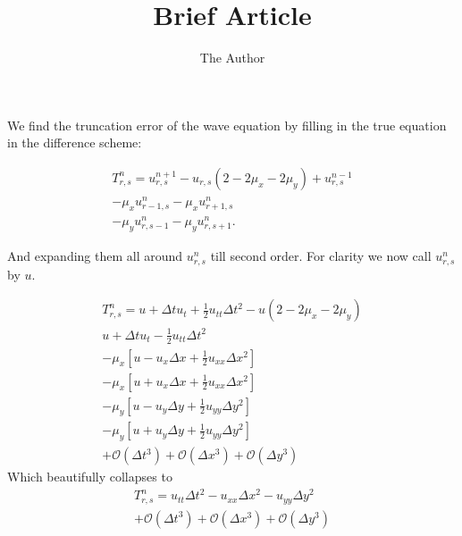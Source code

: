 \documentclass[11pt, oneside]{article}   	%
\title{Brief Article}
\author{The Author}
\begin{document}
\maketitle
We find the truncation error of the wave equation by filling in the true equation in the difference scheme:

\begin{align*}
T_{r,s}^n = u_{r,s}^{n+1} - u_{r,s}(2 - 2\mu_x - 2 \mu_y) + u_{r,s}^{n-1} \\
				 - \mu_x u_{r-1,s}^n - \mu_x u_{r+1,s}^n	  \\
				 - \mu_y u_{r,s-1}^n - \mu_y u_{r,s+1}^n.
\end{align*}

And expanding them all around $u_{r,s}^n$ till second order. For clarity we now call $u_{r,s}^n$ by $u$.

\begin{align*}
T_{r,s}^n = u +  \Delta t u_t + \frac{1}{2} u_{tt} \Delta t^2 - u(2 - 2\mu_x - 2 \mu_y) \\
				u +  \Delta t u_t - \frac{1}{2} u_{tt} \Delta t^2  \\
				 - \mu_x \left[{ u - u_x \Delta x + \frac{1}{2} u_{xx} \Delta x^2 }\right]	  \\
				 - \mu_x \left[{ u + u_x \Delta x + \frac{1}{2} u_{xx} \Delta x^2 }\right]	  \\
				 - \mu_y \left[{ u - u_y \Delta y + \frac{1}{2} u_{yy} \Delta y^2 }\right]	  \\
				 - \mu_y \left[{ u + u_y \Delta y + \frac{1}{2} u_{yy} \Delta y^2 }\right]	  \\
				 + \mathcal{O}(\Delta t^3) + \mathcal{O}(\Delta x^3) + \mathcal{O}(\Delta y^3)
\end{align*}
 Which beautifully collapses to
 \begin{align*}
T_{r,s}^n = u_{tt} \Delta t ^2 - u_{xx}\Delta x ^2 - u_{yy} \Delta y^2   \\
				 + \mathcal{O}(\Delta t^3) + \mathcal{O}(\Delta x^3) + \mathcal{O}(\Delta y^3)
\end{align*}
 
\end{document}
